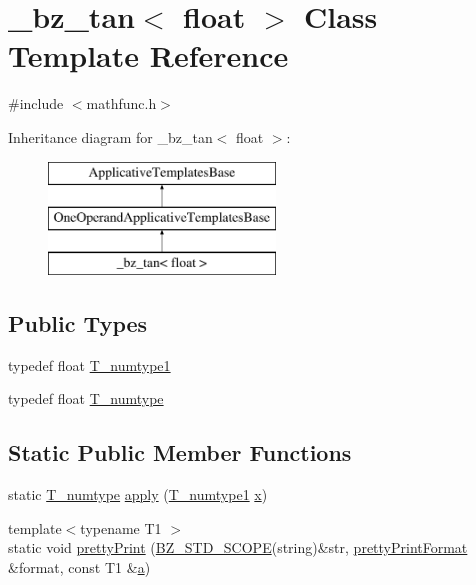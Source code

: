 \hypertarget{class__bz__tan_3_01float_01_4}{}\section{\+\_\+bz\+\_\+tan$<$ float $>$ Class Template Reference}
\label{class__bz__tan_3_01float_01_4}


{\ttfamily \#include $<$mathfunc.\+h$>$}

Inheritance diagram for \+\_\+bz\+\_\+tan$<$ float $>$\+:\begin{figure}[H]
\begin{center}
\leavevmode
\includegraphics[height=3.000000cm]{class__bz__tan_3_01float_01_4}
\end{center}
\end{figure}
\subsection*{Public Types}
\begin{DoxyCompactItemize}
\item 
typedef float \hyperlink{class__bz__tan_3_01float_01_4_aadfe306f01fdd0bea6ab0b59dd3d1bf2}{T\+\_\+numtype1}
\item 
typedef float \hyperlink{class__bz__tan_3_01float_01_4_a3c53bf9f60fea6edfcc0a6b9ee67e3c0}{T\+\_\+numtype}
\end{DoxyCompactItemize}
\subsection*{Static Public Member Functions}
\begin{DoxyCompactItemize}
\item 
static \hyperlink{class__bz__tan_3_01float_01_4_a3c53bf9f60fea6edfcc0a6b9ee67e3c0}{T\+\_\+numtype} \hyperlink{class__bz__tan_3_01float_01_4_a1d73de2a7a741a7801ed6c7235bae415}{apply} (\hyperlink{class__bz__tan_3_01float_01_4_aadfe306f01fdd0bea6ab0b59dd3d1bf2}{T\+\_\+numtype1} \hyperlink{vecnorm1_8cc_ac73eed9e41ec09d58f112f06c2d6cb63}{x})
\item 
{\footnotesize template$<$typename T1 $>$ }\\static void \hyperlink{class__bz__tan_3_01float_01_4_a9a2bd144f33c7a3374ea1db3e2cd1d4e}{pretty\+Print} (\hyperlink{numinquire_8h_a2b24ffc3b4ef9803956bc7715c6c7b83}{B\+Z\+\_\+\+S\+T\+D\+\_\+\+S\+C\+O\+P\+E}(string)\&str, \hyperlink{classprettyPrintFormat}{pretty\+Print\+Format} \&format, const T1 \&\hyperlink{gen__mat5files_8m_aae328bf20413f220e38aec4d95bfd6da}{a})
\end{DoxyCompactItemize}


